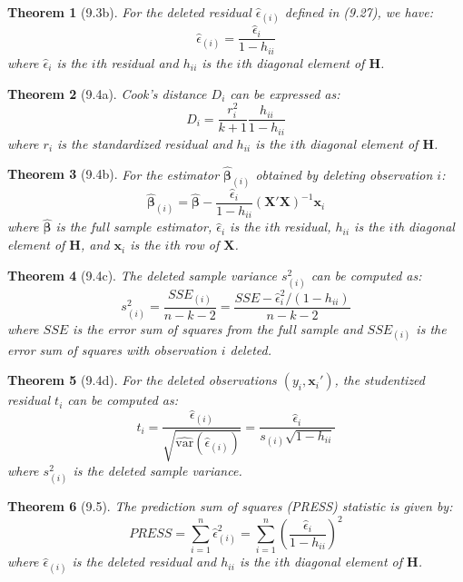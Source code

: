 \documentclass{article}
\newtheorem{theorem}{Theorem}[section]
\begin{document}
\begin{theorem}[9.3b]
For the deleted residual $\hat{\epsilon}_{(i)}$ defined in (9.27), we have:
\[\hat{\epsilon}_{(i)} = \frac{\hat{\epsilon}_i}{1-h_{ii}}\]
where $\hat{\epsilon}_i$ is the $i$th residual and $h_{ii}$ is the $i$th diagonal element of $\mathbf{H}$.
\end{theorem}

\begin{theorem}[9.4a] 
Cook's distance $D_i$ can be expressed as:
\[D_i = \frac{r_i^2}{k+1}\frac{h_{ii}}{1-h_{ii}}\]
where $r_i$ is the standardized residual and $h_{ii}$ is the $i$th diagonal element of $\mathbf{H}$.
\end{theorem}

\begin{theorem}[9.4b]
For the estimator $\hat{\boldsymbol{\beta}}_{(i)}$ obtained by deleting observation $i$:
\[\hat{\boldsymbol{\beta}}_{(i)} = \hat{\boldsymbol{\beta}} - \frac{\hat{\epsilon}_i}{1-h_{ii}}(\mathbf{X}'\mathbf{X})^{-1}\mathbf{x}_i\]
where $\hat{\boldsymbol{\beta}}$ is the full sample estimator, $\hat{\epsilon}_i$ is the $i$th residual, $h_{ii}$ is the $i$th diagonal element of $\mathbf{H}$, and $\mathbf{x}_i$ is the $i$th row of $\mathbf{X}$.
\end{theorem}

\begin{theorem}[9.4c]
The deleted sample variance $s^2_{(i)}$ can be computed as:
\[s^2_{(i)} = \frac{SSE_{(i)}}{n-k-2} = \frac{SSE - \hat{\epsilon}_i^2/(1-h_{ii})}{n-k-2}\]
where $SSE$ is the error sum of squares from the full sample and $SSE_{(i)}$ is the error sum of squares with observation $i$ deleted.
\end{theorem}

\begin{theorem}[9.4d]
For the deleted observations $(y_i, \mathbf{x}_i')$, the studentized residual $t_i$ can be computed as:
\[t_i = \frac{\hat{\epsilon}_{(i)}}{\sqrt{\widehat{\text{var}}(\hat{\epsilon}_{(i)})}} = \frac{\hat{\epsilon}_i}{s_{(i)}\sqrt{1-h_{ii}}}\]
where $s_{(i)}^2$ is the deleted sample variance.
\end{theorem}

\begin{theorem}[9.5]
The prediction sum of squares (PRESS) statistic is given by:
\[PRESS = \sum_{i=1}^n \hat{\epsilon}_{(i)}^2 = \sum_{i=1}^n \left(\frac{\hat{\epsilon}_i}{1-h_{ii}}\right)^2\]
where $\hat{\epsilon}_{(i)}$ is the deleted residual and $h_{ii}$ is the $i$th diagonal element of $\mathbf{H}$.
\end{theorem}
\end{document}

